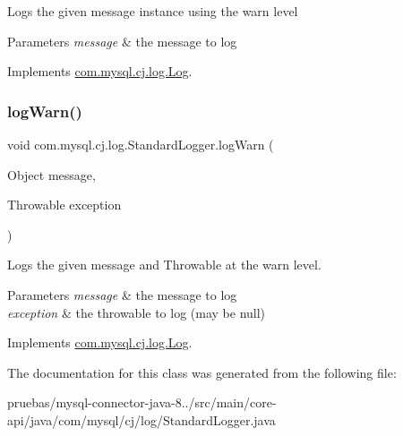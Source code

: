 Logs the given message instance using the \textquotesingle{}warn\textquotesingle{} level


\begin{DoxyParams}{Parameters}
{\em message} & the message to log \\
\hline
\end{DoxyParams}


Implements \mbox{\hyperlink{interfacecom_1_1mysql_1_1cj_1_1log_1_1_log_a3a30dcfb7f5790b79e9db64431107cfc}{com.\+mysql.\+cj.\+log.\+Log}}.

\mbox{\label{classcom_1_1mysql_1_1cj_1_1log_1_1_standard_logger_a3e05a95a97a95afb400144f652f43c78}} 
\subsubsection{\texorpdfstring{log\+Warn()}{logWarn()}\hspace{0.1cm}{\footnotesize\ttfamily [2/2]}}
{\footnotesize\ttfamily void com.\+mysql.\+cj.\+log.\+Standard\+Logger.\+log\+Warn (\begin{DoxyParamCaption}\item[{Object}]{message,  }\item[{Throwable}]{exception }\end{DoxyParamCaption})}

Logs the given message and Throwable at the \textquotesingle{}warn\textquotesingle{} level.


\begin{DoxyParams}{Parameters}
{\em message} & the message to log \\
\hline
{\em exception} & the throwable to log (may be null) \\
\hline
\end{DoxyParams}


Implements \mbox{\hyperlink{interfacecom_1_1mysql_1_1cj_1_1log_1_1_log_a36af866ddfdda47938c768d3d0e68572}{com.\+mysql.\+cj.\+log.\+Log}}.



The documentation for this class was generated from the following file\+:\begin{DoxyCompactItemize}
\item 
pruebas/mysql-\/connector-\/java-\/8../src/main/core-\/api/java/com/mysql/cj/log/Standard\+Logger.\+java\end{DoxyCompactItemize}
